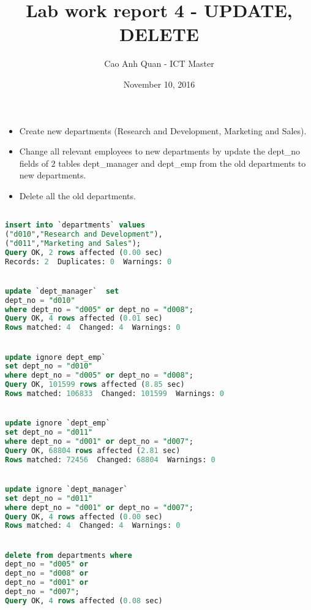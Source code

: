 \documentclass[12pt, letterpaper, twoside]{article}
\title{Lab work report 4 - UPDATE, DELETE}
\author{Cao Anh Quan - ICT Master}
\date{November 10, 2016}
\begin{document}
 
\begin{titlepage}
\maketitle
\end{titlepage}

\begin{itemize}

\item Create new departments (Research and Development, Marketing and Sales).

\item Change all relevant employees to new departments by update the dept\_no fields of $2$ tables dept\_manager and dept\_emp from the old departments to new departments.

\item Delete all the old departments.

\end{itemize}

\begin{lstlisting}[language=SQL]

insert into `departments` values 
("d010","Research and Development"),
("d011","Marketing and Sales");
Query OK, 2 rows affected (0.00 sec)
Records: 2  Duplicates: 0  Warnings: 0


update `dept_manager`  set 
dept_no = "d010" 
where dept_no = "d005" or dept_no = "d008";
Query OK, 4 rows affected (0.01 sec)
Rows matched: 4  Changed: 4  Warnings: 0


update ignore dept_emp`
set dept_no = "d010"
where dept_no = "d005" or dept_no = "d008";
Query OK, 101599 rows affected (8.85 sec)
Rows matched: 106833  Changed: 101599  Warnings: 0


update ignore `dept_emp` 
set dept_no = "d011"
where dept_no = "d001" or dept_no = "d007";
Query OK, 68804 rows affected (2.81 sec)
Rows matched: 72456  Changed: 68804  Warnings: 0


update ignore `dept_manager` 
set dept_no = "d011"
where dept_no = "d001" or dept_no = "d007";
Query OK, 4 rows affected (0.00 sec)
Rows matched: 4  Changed: 4  Warnings: 0


delete from departments where 
dept_no = "d005" or 
dept_no = "d008" or 
dept_no = "d001" or 
dept_no = "d007";
Query OK, 4 rows affected (0.08 sec)

\end{lstlisting}

 
\end{document}
